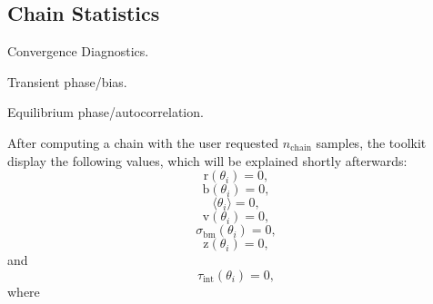 \subsection{Chain Statistics}\label{subsc-mcmc-chain-stats}

Convergence Diagnostics.

Transient phase/bias.

Equilibrium phase/autocorrelation.

After computing a chain with the user requested $n_{\mbox{chain}}$ samples, the toolkit display the following values,
which will be explained shortly afterwards:
\begin{equation}\label{eq-dram-chain-stats-r}
\mbox{r}(\theta_i) = 0,
\end{equation}
%
\begin{equation}\label{eq-dram-chain-stats-b}
\mbox{b}(\theta_i) = 0,
\end{equation}
%
\begin{equation}\label{eq-dram-chain-stats-mean}
\langle\theta_i\rangle = 0,
\end{equation}
%
\begin{equation}\label{eq-dram-chain-stats-var}
\mbox{v}(\theta_i) = 0,
\end{equation}
%
\begin{equation}\label{eq-dram-chain-stats-bm}
\sigma_{\mbox{bm}}(\theta_i) = 0,
\end{equation}
%
\begin{equation}\label{eq-dram-chain-stats-z}
\mbox{z}(\theta_i) = 0,
\end{equation}
and
\begin{equation}\label{eq-dram-chain-stats-tau-int}
\tau_{\mbox{int}}(\theta_i) = 0,
\end{equation}
where
